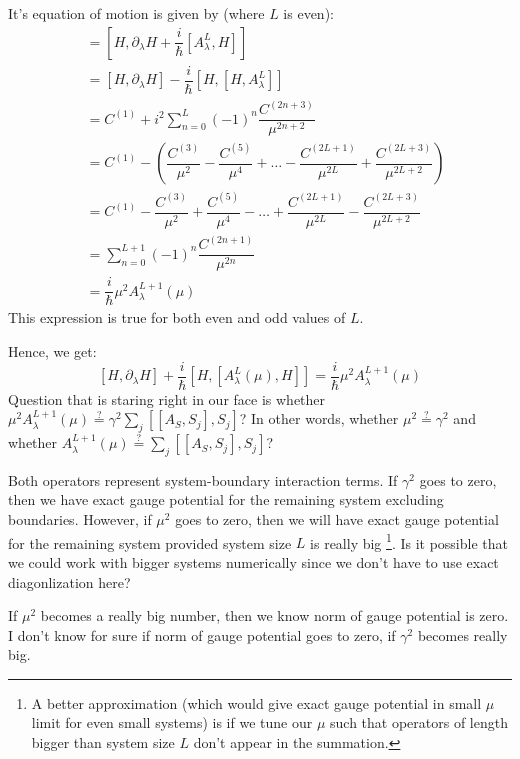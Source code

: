 \documentclass[11pt,a4paper]{article}
\begin{document}
It's equation of motion is given by (where $L$ is even):
\begin{align*}
[H, G_{\lambda}(\mu)^L]&=[H, \partial_{\lambda} H + \dfrac{i}{\hbar} [A_{\lambda}^L, H]] \\
&= [H, \partial_{\lambda} H] - \dfrac{i}{\hbar} [H,[ H, A_{\lambda}^L]]\\
&= C^{(1)} + i^2    \sum_{n=0}^{L}   (-1)^{n} \dfrac{ C^{(2n+3)}}{\mu^{2n+2}}\\
&= C^{(1)} -  (   \dfrac{ C^{(3)}}{\mu^{2}} - \dfrac{ C^{(5)}}{\mu^{4}} + \ldots - \dfrac{ C^{(2L+1)}}{\mu^{2L}}+ \dfrac{ C^{(2L+3)}}{\mu^{2L+2}} )\\
&= C^{(1)} -   \dfrac{ C^{(3)}}{\mu^{2}} + \dfrac{ C^{(5)}}{\mu^{4}} - \ldots  + \dfrac{ C^{(2L+1)}}{\mu^{2L}} - \dfrac{ C^{(2L+3)}}{\mu^{2L+2}}\\
&=\sum_{n=0}^{L+1}   (-1)^{n} \dfrac{ C^{(2n+1)}}{\mu^{2n}}\\
&= \dfrac{i}{\hbar} \mu^2 A_{\lambda}^{L+1} (\mu)
\end{align*}
This expression is true for both even and odd values of $L$.

Hence, we get:
 \begin{equation}
 \boxed{[H, \partial_{\lambda} H] + \dfrac{i}{\hbar}[H, [A_{\lambda}^{L} (\mu), H]]= \dfrac{i}{\hbar} \mu^2 A_{\lambda}^{L+1} (\mu)}
 \end{equation}
Question that is staring right in our face is whether $ \mu^2 A_{\lambda}^{L+1} (\mu)\stackrel{?}{=} \gamma^2 \sum_j  [[A_{S}, S_j], S_j ]$? In other  words, whether $\mu^2 \stackrel{?}{=} \gamma^2 $ and whether $ A_{\lambda}^{L+1} (\mu)\stackrel{?}{=} \sum_j  [[A_{S}, S_j], S_j ]$? 

Both operators represent system-boundary interaction terms. If $\gamma^2$ goes to zero, then we have exact gauge potential for the remaining system excluding boundaries. However, if $\mu^2$ goes to zero, then we will have exact gauge potential for the remaining system provided system size $L$ is really big \footnote{A better approximation (which would give exact gauge potential in small $\mu$ limit for even small systems) is if we tune our $\mu$ such that operators of length bigger than system size $L$ don't appear in the summation.}. Is it possible that we could work with bigger systems numerically since we don't have to use exact diagonlization here?

If $\mu^2$ becomes a really big number, then we know norm of gauge potential is zero. I don't know for sure if  norm of gauge potential goes to zero, if $\gamma^2$ becomes really big.
\end{document}
